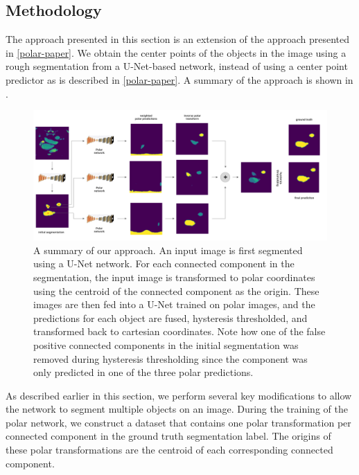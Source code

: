 \subsection{Methodology}

The approach presented in this section is an extension of the approach presented in \ref{polar-paper}. We obtain the center points of the objects in the image using a rough segmentation from a U-Net-based network, instead of using a center point predictor as is described in \ref{polar-paper}. A summary of the approach is shown in .

\begin{figure}[t!]
\centering
\includegraphics[width=\textwidth]{images/4/summary}
\caption{A summary of our approach. An input image is first segmented using a U-Net network. For each connected component in the segmentation, the input image is transformed to polar coordinates using the centroid of the connected component as the origin. These images are then fed into a U-Net trained on polar images, and the predictions for each object are fused, hysteresis thresholded, and transformed back to cartesian coordinates. Note how one of the false positive connected components in the initial segmentation was removed during hysteresis thresholding since the component was only predicted in one of the three polar predictions. \cite{bencevicUsingPolarTransform2022a}}
\label{fig:summary}
\end{figure}

As described earlier in this section, we perform several key modifications to allow the network to segment multiple objects on an image. During the training of the polar network, we construct a dataset that contains one polar transformation per connected component in the ground truth segmentation label. The origins of these polar transformations are the centroid of each corresponding connected component.

